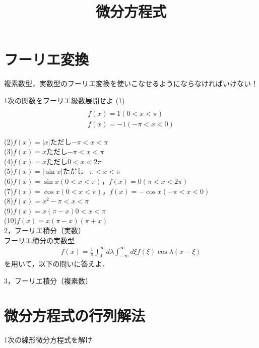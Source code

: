 \documentclass[a4j]{jarticle}
\title{微分方程式}
\begin{document}
\maketitle

\section{フーリエ変換}
複素数型，実数型のフーリエ変換を使いこなせるようにならなければいけない！

1次の関数をフーリエ級数展開せよ
(1)
\begin{align*}\\
    f(x)=1(0<x<\pi)\\
    f(x)=-1(-\pi <x<0)
\end{align*}

(2)$f(x)=|x|$ただし$-\pi<x<\pi$\\

(3)$f(x)=x$ただし$-\pi<x<\pi$\\

(4)$f(x)=x$ただし$0<x<2\pi$\\

(5)$f(x)=|\sin x|$ただし$-\pi<x<\pi$\\

(6)$f(x)=\sin x(0<x<\pi)$，$f(x)=0 (\pi <x<2\pi)$\\

(7)$f(x)=\cos x(0<x<\pi)$，$f(x)=-\cos x(-\pi <x<0)$\\

(8)$f(x)=x^2 -\pi<x<\pi$\\

(9)$f(x)=x(\pi -x) 0<x<\pi$\\

(10)$f(x)=x(\pi -x)(\pi +x)$\\


2，フーリエ積分（実数）\\
フーリエ積分の実数型
\begin{align*}
 f(x)=\frac{1}{\pi}\int_{0}^{\infty}d\lambda\int_{-\infty}^{\infty}d\xi f(\xi)\cos\lambda (x-\xi)
\end{align*}
を用いて，以下の問いに答えよ．

3，フーリエ積分（複素数）\\



 \section{微分方程式の行列解法}
1次の線形微分方程式を解け
\end{document}
